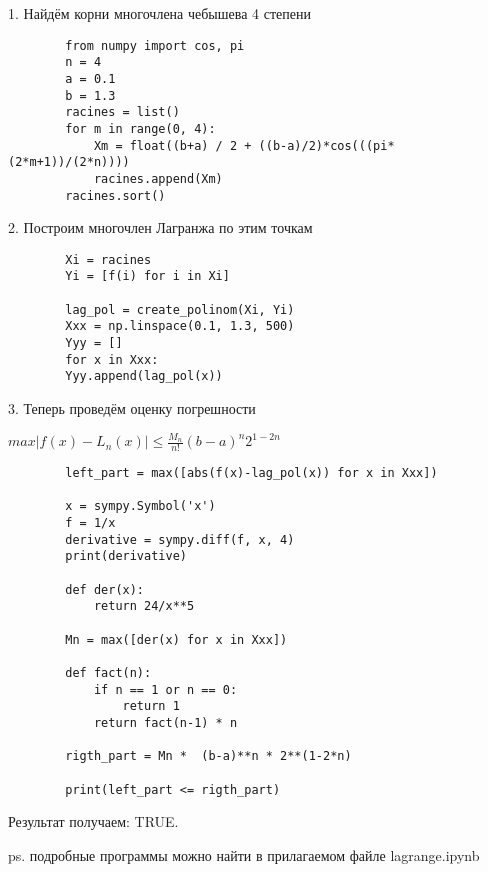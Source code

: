 \documentclass[letterpaper,12pt]{article}
\begin{document}
    1. Найдём корни многочлена чебышева 4 степени

    \begin{lstlisting}
        from numpy import cos, pi
        n = 4
        a = 0.1
        b = 1.3
        racines = list()
        for m in range(0, 4): 
            Xm = float((b+a) / 2 + ((b-a)/2)*cos(((pi*(2*m+1))/(2*n))))
            racines.append(Xm)
        racines.sort()
    \end{lstlisting}

    2. Построим многочлен Лагранжа по этим точкам

    \begin{lstlisting}
        Xi = racines
        Yi = [f(i) for i in Xi]

        lag_pol = create_polinom(Xi, Yi)
        Xxx = np.linspace(0.1, 1.3, 500)
        Yyy = []
        for x in Xxx:
        Yyy.append(lag_pol(x))
    \end{lstlisting}

    3. Теперь проведём оценку погрешности 

    \begin{center}
        $ max|f(x)-L_n(x)| \leqslant \frac{M_n}{n!}(b-a)^n 2^{1-2n} $ 
    \end{center}
    \begin{lstlisting}
        left_part = max([abs(f(x)-lag_pol(x)) for x in Xxx])

        x = sympy.Symbol('x')
        f = 1/x
        derivative = sympy.diff(f, x, 4)
        print(derivative)
        
        def der(x):
            return 24/x**5
        
        Mn = max([der(x) for x in Xxx])
        
        def fact(n):
            if n == 1 or n == 0:
                return 1
            return fact(n-1) * n
        
        rigth_part = Mn *  (b-a)**n * 2**(1-2*n)
        
        print(left_part <= rigth_part)
    \end{lstlisting}

    Результат получаем: TRUE.

    \begin{flushright}
        ps. подробные программы можно 
        найти в прилагаемом файле lagrange.ipynb
    \end{flushright}
\end{document}
